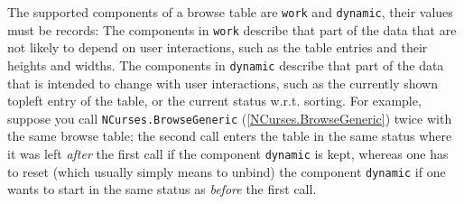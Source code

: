 \documentclass[a4paper,11pt]{report}
\begin{document}
{{{ The supported components of a browse table are \texttt{work} and \texttt{dynamic}, their values must be records: The components in \texttt{work} describe that part of the data that are not likely to depend on user
interactions, such as the table entries and their heights and widths. The
components in \texttt{dynamic} describe that part of the data that is intended to change with user
interactions, such as the currently shown top\texttt{}left entry of
the table, or the current status w.r.t. sorting. For example, suppose you call \texttt{NCurses.BrowseGeneric} (\ref{NCurses.BrowseGeneric}) twice with the same browse table; the second call enters the table in the same
status where it was left \emph{after} the first call if the component \texttt{dynamic} is kept, whereas one has to reset (which usually simply means to unbind) the
component \texttt{dynamic} if one wants to start in the same status as \emph{before} the first call. 

}}}
\end{document}
